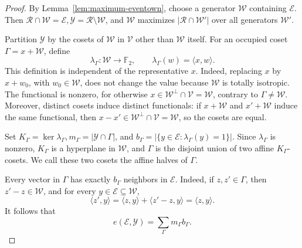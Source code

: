 \documentclass[10pt,a4paper]{amsart}
\begin{document}
\begin{proof}
By Lemma~\ref{lem:maximum-eventown}, choose a generator \(\mathcal W\)
containing \(\mathcal E\).  Then
\(\mathcal R\cap\mathcal W=\mathcal E, \mathcal Y=\mathcal R\setminus\mathcal W\), 
and \(\mathcal W\) maximizes \(|\mathcal R\cap\mathcal W'|\) over all
generators \(\mathcal W'\).

Partition \(\mathcal Y\) by the cosets of \(\mathcal W\) in
\(\mathcal V\) other than \(\mathcal W\) itself.  For an occupied coset
\(\Gamma=x+\mathcal W\), define
\[
 \lambda_\Gamma:\mathcal W\longrightarrow\mathbb F_2,
 \qquad
 \lambda_\Gamma(w)=\langle x,w\rangle.
\]
This definition is independent of the representative \(x\). Indeed, replacing
\(x\) by \(x+w_0\), with \(w_0\in\mathcal W\), does not change the value
because \(\mathcal W\) is totally isotropic.  The functional is nonzero,
for otherwise \(x\in\mathcal W^\perp\cap\mathcal V=\mathcal W\), contrary
to \(\Gamma\ne\mathcal W\).  Moreover, distinct cosets induce distinct functionals:
if \(x+\mathcal W\) and \(x'+\mathcal W\) induce the same functional, then
\(x-x'\in\mathcal W^\perp\cap\mathcal V=\mathcal W\), so the cosets are
equal.

Set \(K_\Gamma=\ker\lambda_\Gamma,
 m_\Gamma=|\mathcal Y\cap\Gamma|\), and \(b_\Gamma =\bigl|\{y\in\mathcal E:\lambda_\Gamma(y)=1\}\bigr|\).
Since \(\lambda_\Gamma\) is nonzero, \(K_\Gamma\) is a hyperplane in
\(\mathcal W\), and \(\Gamma\) is the disjoint union of two affine
\(K_\Gamma\)-cosets.  We call these two cosets the affine halves of
\(\Gamma\).

Every vector in \(\Gamma\) has exactly \(b_\Gamma\) neighbors in
\(\mathcal E\).  Indeed, if \(z,z'\in\Gamma\), then
\(z'-z\in\mathcal W\), and for every \(y\in\mathcal E\subseteq\mathcal W\),
\[
 \langle z',y\rangle
 =
 \langle z,y\rangle+\langle z'-z,y\rangle
 =
 \langle z,y\rangle.
\]
It follows that
\begin{equation}
 e(\mathcal E,\mathcal Y)=\sum_\Gamma m_\Gamma b_\Gamma.
\label{eq:q-cosets}
\end{equation}


\end{proof}
\end{document}

